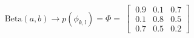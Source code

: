 \documentclass[preview]{standalone}
\begin{document}
\begin{align*}
\text{Beta}(a,b) \longrightarrow p(\phi_{k,l})=\Phi=\
                       \begin{bmatrix}\
                      0.9 & 0.1 & 0.7 \\\
                      0.1 & 0.8 & 0.5 \\\
                      0.7 & 0.5 & 0.2 \end{bmatrix}
\end{align*}
\end{document}
